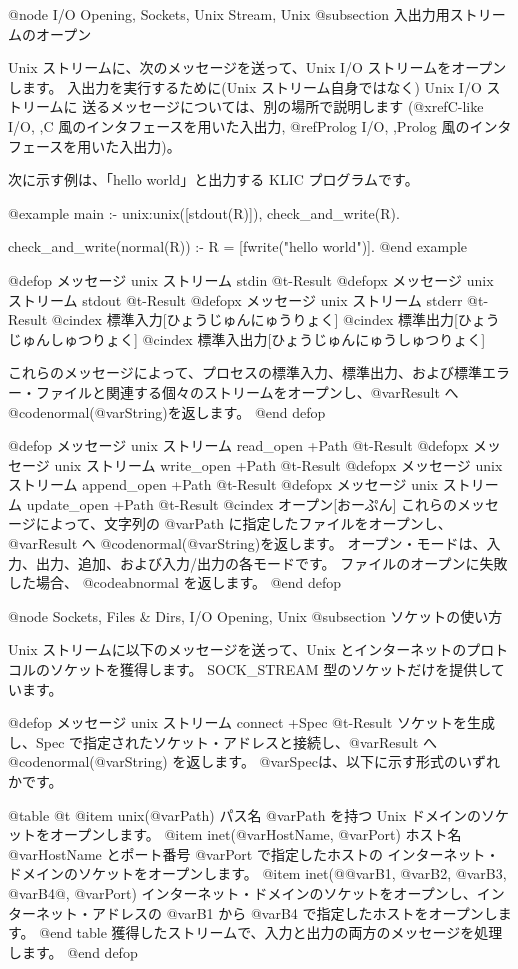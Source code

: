 {{{{@node I/O Opening, Sockets, Unix Stream, Unix
@subsection 入出力用ストリームのオープン

Unix ストリームに、次のメッセージを送って、Unix I/O ストリームをオープンします。
入出力を実行するために(Unix ストリーム自身ではなく) Unix I/O ストリームに
送るメッセージについては、別の場所で説明します
(@xref{C-like I/O, ,C 風のインタフェースを用いた入出力},
@ref{Prolog I/O, ,Prolog 風のインタフェースを用いた入出力})。

次に示す例は、「hello world」と出力する KLIC プログラムです。

@example
main :- unix:unix([stdout(R)]), check_and_write(R).

check_and_write(normal(R)) :- R = [fwrite("hello world\n")].
@end example

@defop {メッセージ} {unix ストリーム} stdin @t{-}Result
@defopx {メッセージ} {unix ストリーム} stdout @t{-}Result
@defopx {メッセージ} {unix ストリーム} stderr @t{-}Result
@cindex 標準入力[ひょうじゅんにゅうりょく]
@cindex 標準出力[ひょうじゅんしゅつりょく]
@cindex 標準入出力[ひょうじゅんにゅうしゅつりょく]

これらのメッセージによって、プロセスの標準入力、標準出力、および標準エラー・ファイルと関連する個々のストリームをオープンし、@var{Result} へ@code{normal(@var{String})}を返します。
@end defop

@defop {メッセージ} {unix ストリーム} read_open +Path @t{-}Result
@defopx {メッセージ} {unix ストリーム} write_open +Path @t{-}Result
@defopx {メッセージ} {unix ストリーム} append_open +Path @t{-}Result
@defopx {メッセージ} {unix ストリーム} update_open +Path @t{-}Result
@cindex オープン[おーぷん]
これらのメッセージによって、文字列の @var{Path} に指定したファイルをオープンし、@var{Result} へ @code{normal(@var{String})}を返します。
オープン・モードは、入力、出力、追加、および入力/出力の各モードです。
ファイルのオープンに失敗した場合、 @code{abnormal} を返します。
@end defop

@node Sockets, Files & Dirs, I/O Opening, Unix
@subsection ソケットの使い方

Unix ストリームに以下のメッセージを送って、Unix とインターネットのプロトコルのソケットを獲得します。
SOCK_STREAM 型のソケットだけを提供しています。

@defop {メッセージ} {unix ストリーム} connect +Spec @t{-}Result
ソケットを生成し、Spec で指定されたソケット・アドレスと接続し、@var{Result} へ @code{normal(@var{String}) }を返します。
@var{Spec}は、以下に示す形式のいずれかです。

@table @t
@item unix(@var{Path})
パス名 @var{Path} を持つ Unix ドメインのソケットをオープンします。
@item inet(@var{HostName}, @var{Port})
ホスト名 @var{HostName} とポート番号 @var{Port} で指定したホストの
インターネット・ドメインのソケットをオープンします。
@item inet(@{@var{B1}, @var{B2}, @var{B3}, @var{B4}@}, @var{Port})
インターネット・ドメインのソケットをオープンし、インターネット・アドレスの @var{B1} から @var{B4} で指定したホストをオープンします。
@end table
獲得したストリームで、入力と出力の両方のメッセージを処理します。
@end defop

}}}}
